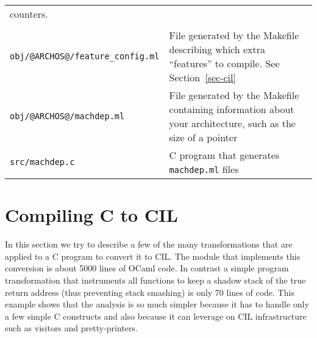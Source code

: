 \documentclass{article}
\def\secref#1{Section~\ref{sec-#1}}
\def\t#1{{\tt #1}}
\begin{document}
\begin{tabular}{ll}
                                  counters. \\
\\
\t{obj/@ARCHOS@/feature\_config.ml}  & File generated by the Makefile
                                      describing which extra ``features''
                                      to compile. See \secref{cil} \\
\t{obj/@ARCHOS@/machdep.ml}     & File generated by the Makefile containing
                                  information about your architecture,
                                  such as the size of a pointer \\
\t{src/machdep.c}               & C program that generates
                                  \t{machdep.ml} files \\
\end{tabular}


\section{Compiling C to CIL}\label{sec-cabs2cil}

 In this section we try to describe a few of the many transformations that are
applied to a C program to convert it to CIL. The module that implements this
conversion is about 5000 lines of OCaml code. In contrast a simple program
transformation that instruments all functions to keep a shadow stack of the
true return address (thus preventing stack smashing) is only 70 lines of code.
This example shows that the analysis is so much simpler because it has to
handle only a few simple C constructs and also because it can leverage on CIL
infrastructure such as visitors and pretty-printers.
\end{document}
